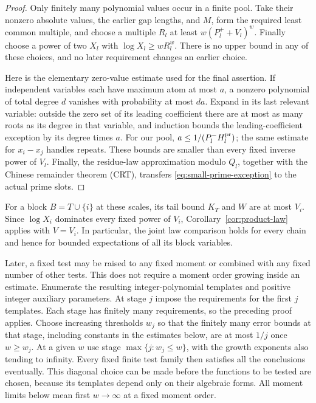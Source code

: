 \begin{proof}
Only finitely many polynomial values occur in a finite pool.  Take
their nonzero absolute values, the earlier gap lengths, and \(M\),
form the required least common multiple, and choose a multiple
\(R_l\) at least \(w(P_l^++V_l)^w\).  Finally choose a power of two
\(X_l\) with \(\log X_l\ge wR_l^w\).  There is no upper bound in
any of these choices, and no later requirement changes an earlier
choice.

Here is the elementary zero-value estimate used for the final
assertion.  If independent variables each have maximum atom at most
\(a\), a nonzero polynomial of total degree \(d\) vanishes with
probability at most \(da\).  Expand in its last relevant variable:
outside the zero set of its leading coefficient there are at most
as many roots as its degree in that variable, and induction bounds
the leading-coefficient exception by its degree times \(a\).
For our pool, \(a\le1/(P_l^-H_l^{\rm pr})\); the same estimate for
\(x_i-x_j\) handles repeats.  These bounds are smaller than every
fixed inverse power of \(V_l\). Finally, the residue-law approximation
modulo \(Q_l\), together with the Chinese remainder theorem (CRT),
transfers \eqref{eq:small-prime-exception} to the actual prime slots.
\end{proof}

For a block \(B=T\cup\{i\}\) at these scales, its tail bound
\(K_T\) and \(W\) are at most \(V_i\).  Since \(\log X_i\)
dominates every fixed power of \(V_i\),
Corollary~\ref{cor:product-law} applies with \(V=V_i\).
In particular, the joint law comparison holds for every chain and
hence for bounded expectations of all its block variables.

\begin{remark}\label{rem:arithmetic-diagonal}
Later, a fixed test may be raised to any fixed moment or combined
with any fixed number of other tests.  This does not require a
moment order growing inside an estimate.  Enumerate the resulting
integer-polynomial templates and positive integer auxiliary parameters.
At stage \(j\) impose the requirements for the first \(j\) templates.
Each stage has finitely many requirements, so the preceding proof
applies.  Choose increasing thresholds \(w_j\) so that the finitely
many error bounds at that stage, including constants in the estimates
below, are at most \(1/j\) once \(w\ge w_j\).  At a given \(w\)
use stage \(\max\{j:w_j\le w\}\), with the growth exponents also
tending to infinity.  Every fixed finite test family then satisfies
all the conclusions eventually.  This diagonal choice can be made
before the functions to be tested are chosen, because its templates
depend only on their algebraic forms.  All moment limits below mean
first \(w\to\infty\) at a fixed moment order.
\end{remark}

